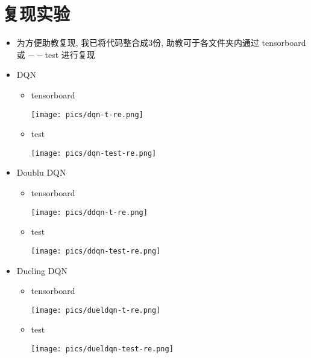 \documentclass[a4paper,12pt]{article}
\begin{document}
\section{复现实验}
\begin{itemize}
    \item 为方便助教复现, 我已将代码整合成3份, 助教可于各文件夹内通过 tensorboard 或 $--$test 进行复现 
    \item DQN
    \begin{itemize}
        \item tensorboard
        \begin{figure*}[h!]
            \centering
            \texttt{[image: pics/dqn-t-re.png]}
        \end{figure*}
        \item test
        \begin{figure*}[h!]
            \centering
            \texttt{[image: pics/dqn-test-re.png]}
        \end{figure*}
    \end{itemize}
    \item Doublu DQN
    \begin{itemize}
        \item tensorboard
        \begin{figure*}[h!]
            \centering
            \texttt{[image: pics/ddqn-t-re.png]}
        \end{figure*}
        \item test
        \begin{figure*}[h!]
            \centering
            \texttt{[image: pics/ddqn-test-re.png]}
        \end{figure*}
    \end{itemize}
    \item Dueling DQN
    \begin{itemize}
        \item tensorboard
        \begin{figure*}[h!]
            \centering
            \texttt{[image: pics/dueldqn-t-re.png]}
        \end{figure*}
        \item test
        \begin{figure*}[h!]
            \centering
            \texttt{[image: pics/dueldqn-test-re.png]}
        \end{figure*}
    \end{itemize}
\end{itemize}
\end{document}
